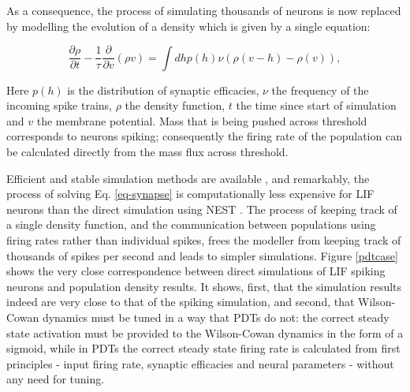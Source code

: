 \documentclass[10pt]{article}
\begin{document}
As a consequence, the process of simulating thousands of neurons is now replaced by modelling the evolution of a density which is given by a single equation:

\begin{equation}
\frac{\partial \rho}{\partial t} -\frac{1}{\tau}\frac{\partial}{\partial v}(\rho v) = \int dh p(h) \nu (\rho(v - h) -\rho(v)),
\label{eq-synapse}
\end{equation} 

Here $p(h)$ is the distribution of synaptic efficacies, $\nu$ the frequency of the incoming spike trains, $\rho$ the density function, $t$ the time since start of simulation and $v$ the membrane potential.
Mass that is being pushed across threshold corresponds to neurons spiking; consequently  the firing rate of the population can be calculated directly from the mass flux across threshold.

Efficient and stable simulation methods are available \cite{nykamp2000population, de2003simple, de2013generic, iyer2013influence}, and remarkably, the process of solving Eq. \ref{eq-synapse} is computationally less expensive for LIF neurons than the direct simulation using NEST \cite{nykamp2000population}.
The process of keeping track of a single density function, and the communication between populations using firing rates rather than individual spikes, frees the modeller from keeping track of thousands of spikes per second and leads to simpler simulations.
Figure \ref{pdtcase} shows the very close correspondence between direct simulations of LIF spiking neurons and population density results.
It shows, first, that the simulation results indeed are very close to that of the spiking simulation, and second, that Wilson-Cowan dynamics must be tuned in a way that PDTs do not: the correct steady state activation must be provided to the Wilson-Cowan dynamics in the form of a sigmoid, while in PDTs the correct steady state firing rate is calculated from first principles - input firing rate, synaptic efficacies and neural parameters - without any need for tuning. 
\end{document}
